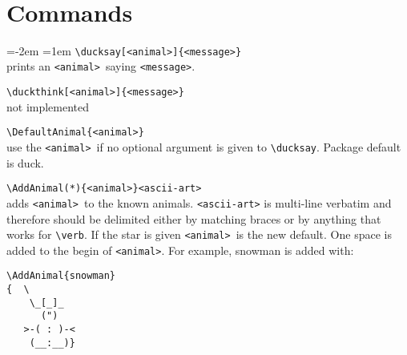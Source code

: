 \documentclass[]{article}
\newcommand*{\anml}{\texttt{<animal>}}
\begin{document}
\begin{titlepage}
  \makeatletter
  \mbox{}\vfil
  \hfil
  \begin{minipage}[c][][c]{\textwidth}
    \LARGE
  \end{minipage}\hfil
  \vfil
  \hspace*{\fill}
  \begin{minipage}{0.5\textwidth}
    \small
  \end{minipage}\\[-15mm]
  \mbox{}\hfil\begin{minipage}[c][][c]{0.5\textwidth}
    \ducksay[cow]{\ducksay@version}
  \end{minipage}\hfil
  \vspace{2cm}
  \vfil
  \vfil
  \begin{minipage}[t][0pt][c]{0.5\textwidth}
    \large
  \end{minipage}\hspace{-1cm}
  \parbox{0.5\textwidth}{
    \small
    }
  \makeatother
\end{titlepage}
\section{Commands}
\bgroup
\parindent=-2em
\parskip=1em
\hspace*{-2em}%
\verb|\ducksay[<animal>]{<message>}|\\ prints an \anml\ saying
\texttt{<message>}.

\verb|\duckthink[<animal>]{<message>}|\\ not implemented

\verb|\DefaultAnimal{<animal>}|\\ use the \anml\ if no optional
argument is given to \verb|\ducksay|. Package default is duck.

\verb|\AddAnimal(*){<animal>}<ascii-art>|\\ adds \anml\ to the known
animals. \texttt{<ascii-art>} is multi-line verbatim and therefore should be
delimited either by matching braces or by anything that works for
\verb|\verb|. If the star is given \anml\ is the new default. One
space is added to the begin of \anml. For example, snowman is added
with:
\begin{verbatim}
\AddAnimal{snowman}
{  \
    \_[_]_
      (")
   >-( : )-<
    (__:__)}
\end{verbatim}
\egroup
\end{document}
